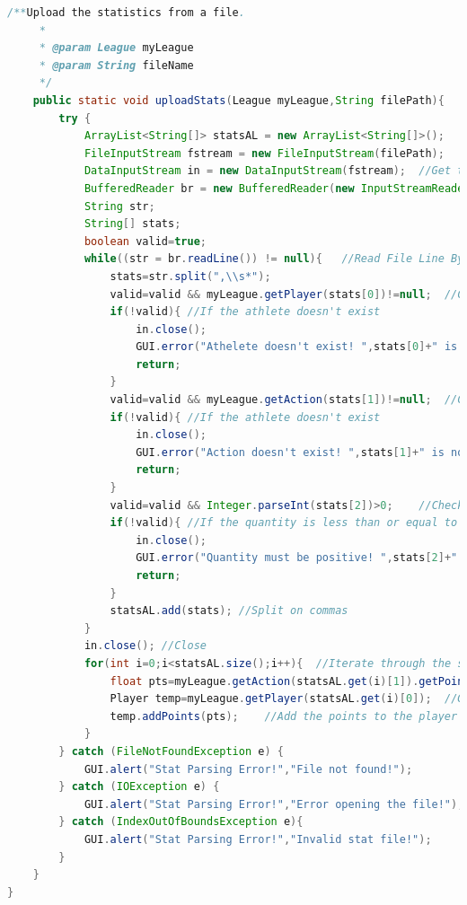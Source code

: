 \documentclass[12pt]{report}
\begin{document}
\begin{singlespace}
\begin{lstlisting}[language=Java,label=some-code,caption={IOManager.java}]
	/**Upload the statistics from a file.
	 * 
	 * @param League myLeague
	 * @param String fileName
	 */
	public static void uploadStats(League myLeague,String filePath){
		try {
			ArrayList<String[]> statsAL = new ArrayList<String[]>();
			FileInputStream fstream = new FileInputStream(filePath);	//Open the file
			DataInputStream in = new DataInputStream(fstream);	//Get the object of DataInputStream
			BufferedReader br = new BufferedReader(new InputStreamReader(in));
			String str;
			String[] stats;
			boolean valid=true;
			while((str = br.readLine()) != null){	//Read File Line By Line
				stats=str.split(",\\s*");
				valid=valid && myLeague.getPlayer(stats[0])!=null;	//Check if the athlete exists
				if(!valid){	//If the athlete doesn't exist
					in.close();
					GUI.error("Athelete doesn't exist! ",stats[0]+" is not a valid athlete.");
					return;
				}
				valid=valid && myLeague.getAction(stats[1])!=null;	//Check if the action exists
				if(!valid){	//If the athlete doesn't exist
					in.close();
					GUI.error("Action doesn't exist! ",stats[1]+" is not a valid action.");
					return;
				}
				valid=valid && Integer.parseInt(stats[2])>0;	//Check if the quantity is greater than zero
				if(!valid){	//If the quantity is less than or equal to zero
					in.close();
					GUI.error("Quantity must be positive! ",stats[2]+" is not a positive number greater than zero.");
					return;
				}
				statsAL.add(stats);	//Split on commas
			}
			in.close();	//Close
			for(int i=0;i<statsAL.size();i++){	//Iterate through the stats
				float pts=myLeague.getAction(statsAL.get(i)[1]).getPoints() * Integer.parseInt(statsAL.get(i)[2]);	//Compute the points
				Player temp=myLeague.getPlayer(statsAL.get(i)[0]);	//Get the player
				temp.addPoints(pts);	//Add the points to the player and thereby the team they're one
			}
		} catch (FileNotFoundException e) {
			GUI.alert("Stat Parsing Error!","File not found!");
		} catch (IOException e) {
			GUI.alert("Stat Parsing Error!","Error opening the file!");
		} catch (IndexOutOfBoundsException e){
			GUI.alert("Stat Parsing Error!","Invalid stat file!");
		}
	}
}
\end{lstlisting}
\end{singlespace}
\end{document}
